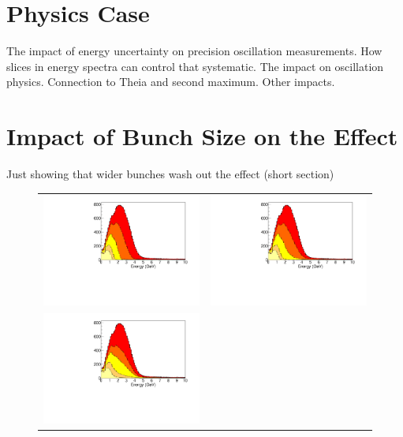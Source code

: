 \documentclass[preprint,12pt]{elsarticle}
\begin{document}
\section{Physics Case}

The impact of energy uncertainty on precision oscillation measurements. How slices in energy spectra can control that systematic. The impact on oscillation physics. Connection to Theia and second maximum. Other impacts.


\section{Impact of Bunch Size on the Effect}

Just showing that wider bunches wash out the effect (short section)

\begin{figure}[t]
	\begin{center}
           	\begin{tabular}{c c}	
           	\includegraphics[width=0.49 \linewidth]{Figures/2018.10.10_LBNFtiming/DUNEbeam_truetimingB.pdf} &
			\includegraphics[width=0.49 \linewidth]{Figures/2018.10.10_LBNFtiming/DUNEbeam_100psecB.pdf} \\
           	\includegraphics[width=0.49 \linewidth]{Figures/2018.10.10_LBNFtiming/DUNEbeam_250psecB.pdf} &

\end{tabular}
\end{center}
\end{figure}
\end{document}
